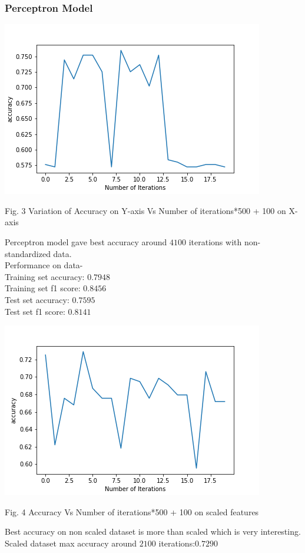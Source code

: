 \documentclass[12pt,journal,compsoc]{IEEEtran}
\begin{document}
\subsubsection{Perceptron Model}
\begin{center}
\includegraphics[scale=0.50]{report/perceptron_accuracy_harsh.png}

{\small Fig. 3 Variation of Accuracy on Y-axis Vs Number of iterations*500 + 100 on X-axis}
\end{center}

Perceptron model gave best accuracy around $4100$ iterations with non-standardized data.\\
Performance on data-\\ 
Training set accuracy: $0.7948$\\
Training set f1 score: $0.8456$\\
Test set accuracy: $0.7595$\\
Test set f1 score: $0.8141$\\
\begin{center}
\includegraphics[scale=0.50]{report/scaled_perceptron.png}

{\small Fig. 4 Accuracy Vs Number of iterations*500 + 100 on scaled features}
\end{center}
Best accuracy on non scaled dataset is more than scaled which is very interesting.\\
Scaled dataset max accuracy around $2100$ iterations:$0.7290$ \\
\end{document}
